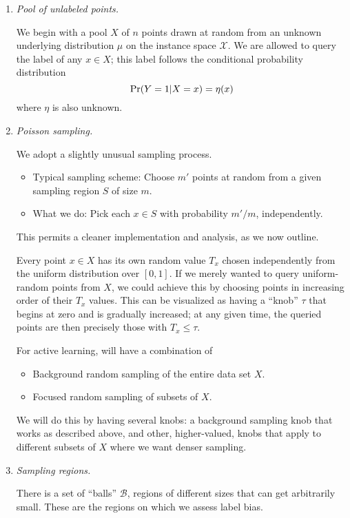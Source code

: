 \documentclass{article}
\def\pr{{\rm Pr}}
\def\X{{\mathcal X}}
\def\B{{\mathcal B}}
\begin{document}
\begin{enumerate}

\item {\it Pool of unlabeled points.} 

We begin with a pool $X$ of $n$ points drawn at random from an unknown underlying distribution $\mu$ on the instance space $\X$. We are allowed to query the label of any $x \in X$; this label follows the conditional probability distribution
$$ \pr(Y = 1|X = x) = \eta(x)$$
where $\eta$ is also unknown.

\item {\it Poisson sampling.} 

We adopt a slightly unusual sampling process.
\begin{itemize}
\item Typical sampling scheme: Choose $m'$ points at random from a given sampling region $S$ of size $m$.
\item What we do: Pick each $x \in S$ with probability $m'/m$, independently.
\end{itemize}
This permits a cleaner implementation and analysis, as we now outline. 

Every point $x \in X$ has its own random value $T_x$ chosen independently from the uniform distribution over $[0,1]$. If we merely wanted to query uniform-random points from $X$, we could achieve this by choosing points in increasing order of their $T_x$ values. This can be visualized as having a ``knob'' $\tau$ that begins at zero and is gradually increased; at any given time, the queried points are then precisely those with $T_x \leq \tau$.

For active learning, will have a combination of
\begin{itemize}
\item Background random sampling of the entire data set $X$.
\item Focused random sampling of subsets of $X$.
\end{itemize}
We will do this by having several knobs: a background sampling knob that works as described above, and other, higher-valued, knobs that apply to different subsets of $X$ where we want denser sampling.

\item {\it Sampling regions.}

There is a set of ``balls'' $\B$, regions of different sizes that can get arbitrarily small. These are the regions on which we assess label bias. 

\begin{enumerate}


\end{enumerate}
\end{enumerate}
\end{document}
